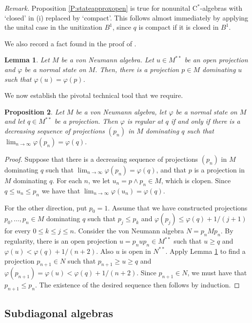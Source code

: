 \documentclass[10pt]{amsart}
\newcommand{\rC}{\mathrm{C}}
\renewcommand{\phi}{\varphi}
\newtheorem{lemma}{Lemma}[section]
\newtheorem{proposition}[lemma]{Proposition}
\theoremstyle{definition}
\begin{document}
{\em Remark.} Proposition \ref{P:stateapproxopen} is true for nonunital $\rC^*$-algebras with `closed' in (i) replaced by `compact'.  This follows almost immediately by applying the unital case in the unitization $B^1$,
since  $q$ is compact if it is closed in $B^1$.

\medskip

We also record a fact found in the proof of \cite[Proposition II.14]{akemann1969}.   


\begin{lemma}\label{L:openvN}
Let $M$ be a von Neumann algebra. Let $u\in M^{**}$ be an open projection and $\phi$ be a normal state on $M$. Then, there is a projection $p\in M$ dominating $u$ such that $\phi(u)=\phi(p)$.
\end{lemma}


We now establish the pivotal technical tool that we require.

\begin{proposition}\label{P:sequenceproj}
 Let $M$ be a von Neumann algebra, let $\phi$ be a normal state on $M$ and let $q\in M^{**}$ be a projection.
 Then $\phi$ is regular at $q$ if and only if there is a decreasing sequence of projections $(p_n)$ in $M$ dominating $q$ such that $\lim_{n\to\infty}\phi(p_n)=\phi(q)$.
\end{proposition}
\begin{proof}  Suppose that  there is a decreasing sequence of projections $(p_n)$ in $M$ dominating $q$ such that $\lim_{n\to\infty}\phi(p_n)= \phi(q)$, and that 
$p$  is a projection in $M$ dominating $q$. For each $n$, we let $u_n=p\wedge p_n\in M$, which is clopen.  Since $q \leq u_n  \leq p_n$ we have that $\lim_{n\to\infty} \phi(u_n) =\phi(q)$.

For the other direction, put $p_0=1$.  Assume that we have constructed  projections $p_0,\ldots,p_n\in M$ dominating $q$ such that $p_j\leq p_k$ and $\phi(p_j)\leq \phi(q) + 1/(j+1)$ for every $0\leq k\leq j\leq n$. Consider the von Neumann algebra $N=p_n M p_n$. By regularity, there is an open projection $u = p_n u p_n \in M^{**}$ such that $u\geq q$ and $\phi(u)< \phi(q) + 1/(n+2)$.   Also $u$ is open in $N^{**}$.
Apply  Lemma \ref{L:openvN} to find a projection $p_{n+1}\in N$ such that $p_{n+1}\geq 
u \geq q$ and $\phi(p_{n+1})=\phi(u) < \phi(q) + 1/(n+2)$. Since $p_{n+1}\in N$, we must have that $p_{n+1}\leq p_n$. The existence of the desired sequence then follows by induction.
\end{proof}


\subsection{Subdiagonal algebras}
\end{document}

